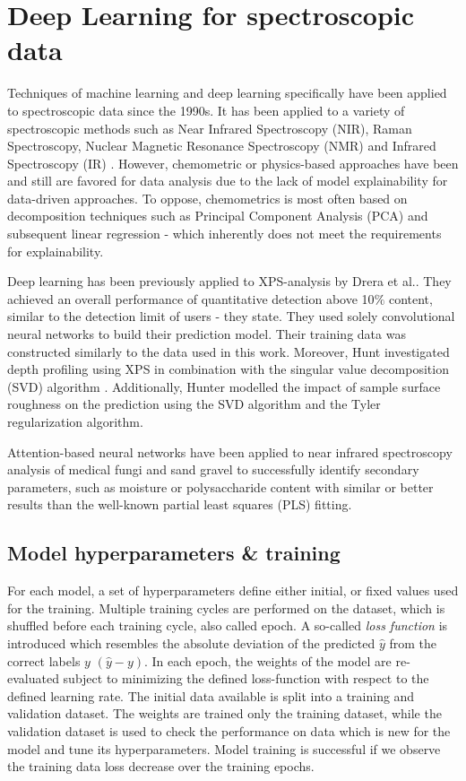 \label{DL_theory}
\section{Deep Learning for spectroscopic data}

Techniques of machine learning and deep learning specifically have been applied to spectroscopic data since the 1990s. It has been applied to a variety of spectroscopic methods such as Near Infrared Spectroscopy (NIR), Raman Spectroscopy, Nuclear Magnetic Resonance Spectroscopy (NMR) and Infrared Spectroscopy (IR) . However, chemometric or physics-based approaches have been and still are favored for data analysis due to the lack of model explainability for data-driven approaches. To oppose, chemometrics is most often based on decomposition techniques such as Principal Component Analysis (PCA) and subsequent linear regression - which inherently does not meet the requirements for explainability.

Deep learning has been previously applied to XPS-analysis by Drera et al.\cite{drera_deep_2019}. They achieved an overall performance of quantitative detection above 10$\%$ content, similar to the detection limit of users - they state. They used solely convolutional neural networks to build their prediction model. Their training data was constructed similarly to the data used in this work. Moreover, Hunt investigated depth profiling using XPS in combination with the singular value decomposition (SVD) algorithm \cite{hunt_depth_2000}. Additionally, Hunter modelled the impact of sample surface roughness on the prediction using the SVD algorithm and the Tyler regularization algorithm.

Attention-based neural networks have been applied to near infrared spectroscopy analysis of medical fungi \cite{huang_attention_2019} and sand gravel \cite{yuan_hybrid_2022} to successfully identify secondary parameters, such as moisture or polysaccharide content with similar or better results than the well-known partial least squares (PLS) fitting.


\subsection{Model hyperparameters \& training}
For each model, a set of hyperparameters define either initial, or fixed values used for the training. 
Multiple training cycles are performed on the dataset, which is shuffled before each training cycle, also called epoch. A so-called \emph{loss function} is introduced which resembles the absolute deviation of the predicted $\hat{y}$ from the correct labels $y$ $(\hat{y} - y)$.
In each epoch, the weights of the model are re-evaluated subject to minimizing the defined loss-function with respect to the defined learning rate. The initial data available is split into a training and validation dataset. The weights are trained only the training dataset, while the validation dataset is used to check the performance on data which is new for the model and tune its hyperparameters. Model training is successful if we observe the training data loss decrease over the training epochs. 


